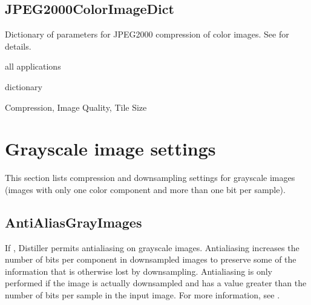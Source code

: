 \documentclass[letterpaper,12pt,english,openany,oneside]{sphinxmanual}
\begin{document}
\subsection{JPEG2000ColorImageDict}
\label{\detokenize{PDF_Create_CommonSettings:jpeg2000colorimagedict}}
Dictionary of parameters for JPEG2000 compression of color images. See  for details.

\label{\detokenize{PDF_Create_CommonSettings:supported-by-35}}

all applications

\label{\detokenize{PDF_Create_CommonSettings:type-35}}

dictionary

\label{\detokenize{PDF_Create_CommonSettings:ui-name-26}}

Compression, Image Quality, Tile Size

\label{\detokenize{PDF_Create_CommonSettings:default-value-32}}

\begin{sphinxVerbatim}[commandchars=\\\{\}]
    
\end{sphinxVerbatim}




\section{Grayscale image settings}
\label{\detokenize{PDF_Create_CommonSettings:grayscale-image-settings}}
This section lists compression and downsampling settings for grayscale images (images with only one color component and more than one bit per sample).




\subsection{AntiAliasGrayImages}
\label{\detokenize{PDF_Create_CommonSettings:antialiasgrayimages}}
If  , Distiller permits anti\sphinxhyphen{}aliasing on grayscale images. Anti\sphinxhyphen{}aliasing increases the number of bits per component in downsampled images to preserve some of the information that is otherwise lost by downsampling. Anti\sphinxhyphen{}aliasing is only performed if the image is actually downsampled and  has a value greater than the number of bits per sample in the input image. For more information, see .
\end{document}
